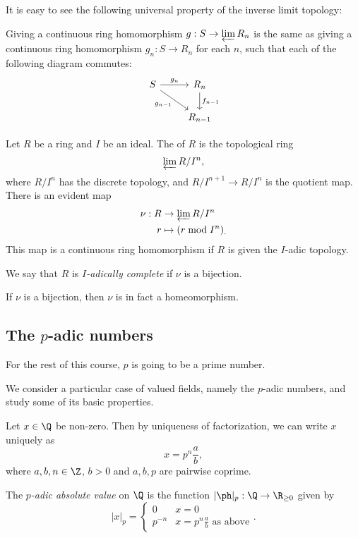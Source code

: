 \documentclass[a4paper]{article}
\begin{document}
It is easy to see the following universal property of the inverse limit topology:
\begin{prop}
  Giving a continuous ring homomorphism $g: S \to \varprojlim R_n$ is the same as giving a continuous ring homomorphism $g_n: S \to R_n$ for each $n$, such that each of the following diagram commutes:
  \[
    \begin{tikzcd}
      S \ar[r, "g_n"] \ar[rd, "g_{n - 1}"'] & R_n \ar[d, "f_{n - 1}"]\\
      & R_{n - 1}
    \end{tikzcd}
  \]
\end{prop}
\begin{defi}
  Let $R$ be a ring and $I$ be an ideal. The  of $R$ is the topological ring
  \[
    \varprojlim R/I^n,
  \]
  where $R/I^n$ has the discrete topology, and $R/I^{n + 1} \to R/I^n$ is the quotient map. There is an evident map
  \begin{align*}
    \nu: R &\to \varprojlim R/I^n\\
    r &\mapsto (r \bmod I^n)_.
  \end{align*}
  This map is a continuous ring homomorphism if $R$ is given the $I$-adic topology.
\end{defi}

\begin{defi}
  We say that $R$ is \emph{$I$-adically complete} if $\nu$ is a bijection.
\end{defi}

\begin{ex}
  If $\nu$ is a bijection, then $\nu$ is in fact a homeomorphism.
\end{ex}

\subsection{The \texorpdfstring{$p$}{p}-adic numbers}
For the rest of this course, $p$ is going to be a prime number.

We consider a particular case of valued fields, namely the $p$-adic numbers, and study some of its basic properties.

Let $x \in \Q$ be non-zero. Then by uniqueness of factorization, we can write $x$ uniquely as
\[
  x =p^n \frac{a}{b},
\]
where $a, b, n \in \Z$, $b > 0$ and $a, b, p$ are pairwise coprime.

\begin{defi}
  The \emph{$p$-adic absolute value} on $\Q$ is the function $|\ph|_p: \Q \to \R_{\geq 0}$ given by
  \[
    |x|_p =
    \begin{cases}
      0 & x = 0\\
      p^{-n} & x = p^n \frac{a}{b}\text{ as above}
    \end{cases}.
  \]
\end{defi}
\end{document}
